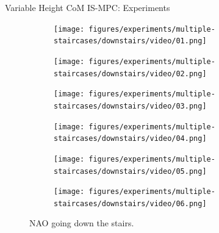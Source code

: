\documentclass[10pt]{beamer}
\begin{document}
\begin{frame}{Variable Height CoM IS-MPC: Experiments}
	\begin{figure}
		\begin{subfigure}{0.40\textwidth}
			\texttt{[image: figures/experiments/multiple-staircases/downstairs/video/01.png]}
		\end{subfigure}\hspace*{0.05cm}%
		\begin{subfigure}{0.40\textwidth}
			\texttt{[image: figures/experiments/multiple-staircases/downstairs/video/02.png]}
		\end{subfigure}
		\begin{subfigure}{0.40\textwidth}
			\texttt{[image: figures/experiments/multiple-staircases/downstairs/video/03.png]}
		\end{subfigure}\hspace*{0.05cm}%
		\begin{subfigure}{0.40\textwidth}
			\texttt{[image: figures/experiments/multiple-staircases/downstairs/video/04.png]}
		\end{subfigure}
		\begin{subfigure}{0.40\textwidth}
			\texttt{[image: figures/experiments/multiple-staircases/downstairs/video/05.png]}
		\end{subfigure}\hspace*{0.05cm}%
		\begin{subfigure}{0.40\textwidth}
			\texttt{[image: figures/experiments/multiple-staircases/downstairs/video/06.png]}
		\end{subfigure}
		\caption{NAO going down the stairs.}
	\end{figure}
\end{frame}
\end{document}
